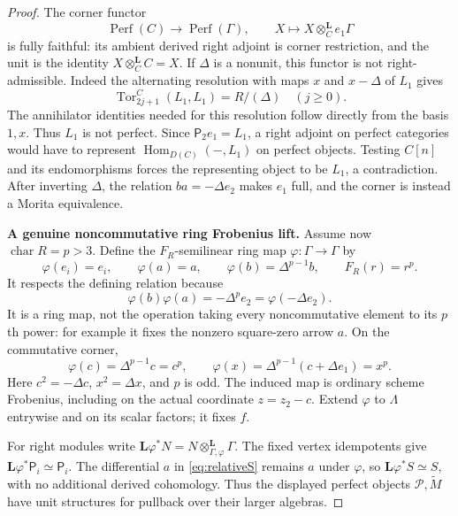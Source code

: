 \documentclass[11pt,a4paper]{article}
\theoremstyle{named}\newtheorem{finding}{Finding}[section]
\theoremstyle{definition}\newtheorem{definition}[finding]{Definition}
\theoremstyle{remark}\newtheorem{remark}[finding]{Remark}
\begin{document}
\begin{proof}
The corner functor
\[
 \operatorname{Perf}(C)\longrightarrow\operatorname{Perf}(\Gamma),
 \qquad X\longmapsto X\otimes_C^{\mathbf L}e_1\Gamma
\]
is fully faithful: its ambient derived right adjoint is
corner restriction, and the unit is the identity
$X\otimes_C^{\mathbf L}C=X$.
If $\Delta$ is a nonunit, this functor is not
right-admissible. Indeed the alternating resolution
with maps $x$ and $x-\Delta$ of $L_1$ gives
\[
 \operatorname{Tor}_{2j+1}^C(L_1,L_1)=R/(\Delta)
       \quad(j\ge0).
\]
The annihilator identities needed for this resolution
follow directly from the basis $1,x$. Thus $L_1$ is
not perfect. Since $\mathsf P_2e_1=L_1$, a right
adjoint on perfect categories would have to represent
$\operatorname{Hom}_{D(C)}(-,L_1)$ on perfect objects.
Testing $C[n]$ and its endomorphisms forces the
representing object to be $L_1$, a contradiction.
After inverting $\Delta$, the relation
$ba=-\Delta e_2$ makes $e_1$ full, and the corner
is instead a Morita equivalence.

\par\smallskip\noindent\textbf{A genuine noncommutative ring Frobenius lift.}\quad
Assume now $\operatorname{char}R=p>3$. Define the
$F_R$-semilinear ring map $\varphi:\Gamma\to\Gamma$ by
\begin{equation}\label{eq:relativefrobenius}
 \varphi(e_i)=e_i,\qquad
 \varphi(a)=a,\qquad
 \varphi(b)=\Delta^{p-1}b,\qquad F_R(r)=r^p.
\end{equation}
It respects the defining relation because
\[
 \varphi(b)\varphi(a)
       =-\Delta^p e_2=\varphi(-\Delta e_2).
\]
It is a ring map, not the operation taking every
noncommutative element to its $p$th power: for example
it fixes the nonzero square-zero arrow $a$.
On the commutative corner,
\[
 \varphi(c)=\Delta^{p-1}c=c^p,\qquad
 \varphi(x)=\Delta^{p-1}(c+\Delta e_1)=x^p.
\]
Here $c^2=-\Delta c$, $x^2=\Delta x$, and $p$ is odd.
The induced map is ordinary scheme Frobenius, including
on the actual coordinate $z=z_2-c$. Extend $\varphi$
to $\Lambda$ entrywise and on its scalar factors; it
fixes $f$.

For right modules write
$\mathbf L\varphi^*N=N\otimes_{\Gamma,\varphi}^{\mathbf L}\Gamma$.
The fixed vertex idempotents give
$\mathbf L\varphi^*\mathsf P_i\simeq\mathsf P_i$.
The differential $a$ in \eqref{eq:relativeS} remains
$a$ under $\varphi$, so
$\mathbf L\varphi^*S\simeq S$, with no additional
derived cohomology. Thus the displayed perfect objects
$\mathcal P,\widetilde M$ have unit structures for
pullback over their larger algebras.


\end{proof}
\end{document}
